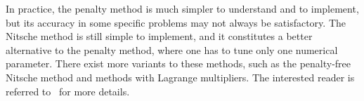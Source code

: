 In practice, the penalty method is much simpler to understand and to implement, but its accuracy in some specific problems may not always be satisfactory. The Nitsche method is still simple to implement, and it constitutes a better alternative to the penalty method, where one has to tune only one numerical parameter. There exist more variants to these methods, such as the penalty-free Nitsche method and methods with Lagrange multipliers. The interested reader is referred to~\cite{Chouly2024} for more details.